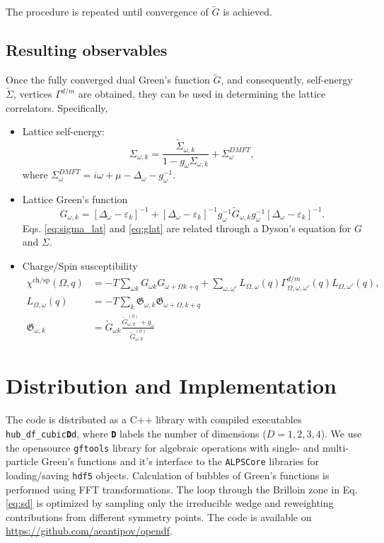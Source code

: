 \documentclass[3p,times,procedia]{elsarticle}
\begin{document}
The procedure is repeated until convergence of $\tilde G$ is achieved. 

\subsection{Resulting observables}
Once the fully converged dual Green's function $\tilde G$, and consequently, self-energy $\tilde \Sigma$, vertices $\Gamma^{d/m}$ are obtained, they can be used in determining the lattice correlators. Specifically, 
\begin{itemize}
\item Lattice self-energy: 
\begin{equation}\label{eq:sigma_lat}
\Sigma_{\omega, k} = \frac{\tilde \Sigma_{\omega, k}}{1 - g_\omega \Sigma_{\omega, k}} + \Sigma^{DMFT}_{\omega},
\end{equation}
where $\Sigma^{DMFT}_{\omega} = i\omega + \mu - \Delta_{\omega} - g_\omega^{-1}$. 
\item Lattice Green's function
\begin{equation}\label{eq:glat}
G_{\omega,k} = \left[\Delta_{\omega} - \varepsilon_{k}\right]^{-1} + \left[\Delta_{\omega} - \varepsilon_{k}\right]^{-1} g_{\omega}^{-1} \tilde G_{\omega, k} g_{\omega}^{-1} \left[\Delta_{\omega} - \varepsilon_{k}\right]^{-1}.
\end{equation}
Eqs. \ref{eq:sigma_lat} and \ref{eq:glat} are related through a Dyson's equation for $G$ and $\Sigma$. 
\item Charge/Spin susceptibility 
\begin{align}
\chi^{\mathrm{ch/sp}} (\Omega, q) & = -T \sum_{\omega k} G_{\omega k} G_{\omega+\Omega k+q} + \sum_{\omega,\omega'} L_{\Omega, \omega}(q) \Gamma^{d/m}_{\Omega,\omega,\omega'}(q) L_{\Omega, \omega'}(q), \\
L_{\Omega, \omega}(q) & = -T \sum_k \mathfrak{G}_{\omega,k} \mathfrak{G}_{\omega + \Omega,k + q} \\
\mathfrak{G}_{\omega,k} & = \tilde G_{\omega k} \frac{\tilde G^{(0)}_{\omega, k} + g_\omega}{\tilde G^{(0)}_{\omega, k}}
\end{align}
\end{itemize}

\section{Distribution and Implementation}\label{sec:imp}
The code is distributed as a C++ library with compiled executables \texttt{hub\_df\_cubic{\bf D}d}, where \texttt{\bf D} labels the number of dimensions ($D=1,2,3,4$). We use the opensource \texttt{gftools} library \cite{gftools} for algebraic operations with single- and multi-particle Green's functions and it's interface to the \texttt{ALPSCore} libraries \cite{ALPSCore} for loading/saving \texttt{hdf5} objects. Calculation of bubbles of Green's functions is performed using FFT transformations. The loop through the Brilloin zone in Eq. \ref{eq:sd} is optimized by sampling only the irreducible wedge and reweighting contributions from different symmetry points. The code is available on \url{https://github.com/aeantipov/opendf}.
\end{document}
